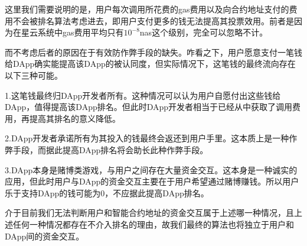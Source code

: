 这里我们需要说明的是，用户每次调用所花费的gas费用以及向合约地址支付的费用不会被排名算法考虑进去，即用户支付更多的钱无法提高其投票效用。前者是因为在星云系统中gas费用平均只有$10^{-8}$nas这个级别，完全可以忽略不计。

而不考虑后者的原因在于有效防作弊手段的缺失。咋看之下，用户愿意支付一笔钱给DApp确实能提高该DApp的被认同度，但实际情况下，这笔钱的最终流向存在以下三种可能。

1.这笔钱最终归DApp开发者所有。这种情况可以认为用户自愿付出这些钱给DApp，值得提高该DApp排名。但此时DApp开发者相当于已经从中获取了调用费用，再提高其排名的意义降低。

2.DApp开发者承诺所有为其投入的钱最终会返还到用户手里。这本质上是一种作弊手段，而据此提高DApp排名将会助长此种作弊手段。

3.DApp本身是赌博类游戏，与用户之间存在大量资金交互。这本身是一种诚实的应用，但此时用户与DApp的资金交互主要在于用户希望通过赌博赚钱。所以用户乐于支持DApp的钱可能为0，不应据此提高DApp排名。

介于目前我们无法判断用户和智能合约地址的资金交互属于上述哪一种情况，且上述任何一种情况都存在不介入排名的理由，故我们最终的算法也将独立于用户和DApp间的资金交互。
